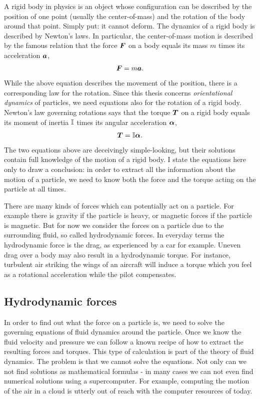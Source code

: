 \documentclass[thesis.tex]{subfiles}
\begin{document}
A rigid body in physics is an object whose configuration can be described by the position of one point (usually the center-of-mass) and the rotation of the body around that point. Simply put: it cannot deform. The dynamics of a rigid body is described by Newton's laws. In particular, the center-of-mass motion is described by the famous relation that the force $\mbox{\boldmath$F$}$ on a body equals its mass $m$ times its acceleration $\mbox{\boldmath$a$}$,
\begin{align*}
	\mbox{\boldmath$F$} = m\mbox{\boldmath$a$}.
\end{align*}
While the above equation describes the movement of the position, there is a corresponding law for the rotation. Since this thesis concerns \emph{orientational dynamics} of particles, we need equations also for the rotation of a rigid body. Newton's law governing rotations says that the torque $\mbox{\boldmath$T$}$ on a rigid body equals its moment of inertia $\mathbb{I}$ times its angular acceleration $\mbox{\boldmath$\alpha$}$,
\begin{align*}
	\mbox{\boldmath$T$} = \mathbb{I} \mbox{\boldmath$\alpha$}.
\end{align*}
The two equations above are deceivingly simple-looking, but their solutions contain full knowledge of the motion of a rigid body. I state the equations here only to draw a conclusion: in order to extract all the information about the motion of a particle, we need to know both the force and the torque acting on the particle at all times.

There are many kinds of forces which can potentially act on a particle. For example there is gravity if the particle is heavy, or magnetic forces if the particle is magnetic. But for now we consider the forces on a particle due to the surrounding fluid, so called hydrodynamic forces. In everyday terms the hydrodynamic force is the drag, as experienced by a car for example. Uneven drag over a body may also result in a hydrodynamic torque. For instance, turbulent air striking the wings of an aircraft will induce a torque which you feel as a rotational acceleration while the pilot compensates.

\subsection*{Hydrodynamic forces}

In order to find out what the force on a particle is, we need to solve the governing equations of fluid dynamics around the particle. Once we know the fluid velocity and pressure we can follow a known recipe of how to extract the resulting forces and torques. This type of calculation is part of the theory of fluid dynamics. The problem is that we cannot solve the equations. Not only can we not find solutions as mathematical formulas - in many cases we can not even find numerical solutions using a supercomputer. For example, computing the motion of the air in a cloud is utterly out of reach with the computer resources of today.
\end{document}
